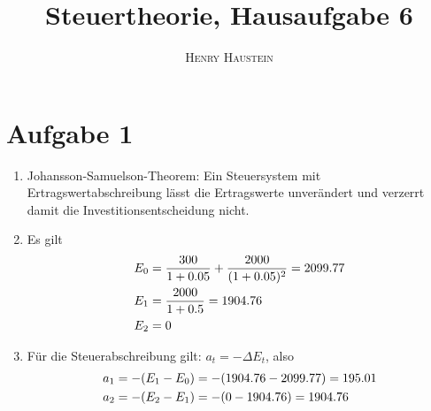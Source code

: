 \documentclass{article}
\title{\textbf{Steuertheorie, Hausaufgabe 6}}
\author{\textsc{Henry Haustein}}
\date{}
\begin{document}
	\maketitle
	
	\section*{Aufgabe 1}
	\begin{enumerate}[label=(\alph*)]
		\item Johansson-Samuelson-Theorem: Ein Steuersystem mit Ertragswertabschreibung lässt die Ertragswerte unverändert und verzerrt damit die Investitionsentscheidung nicht.
		\item Es gilt
		\begin{align}
			E_0 &= \frac{300}{1+0.05} + \frac{2000}{(1+0.05)^2} = 2099.77 \notag \\
			E_1 &= \frac{2000}{1+0.5} = 1904.76 \notag \\
			E_2 &= 0 \notag
		\end{align}
		\item Für die Steuerabschreibung gilt: $a_t=-\Delta E_t$, also
		\begin{align}
			a_1 &= -(E_1-E_0) = -(1904.76-2099.77) = 195.01 \notag \\
			a_2 &= -(E_2-E_1) = -(0-1904.76) = 1904.76 \notag
		\end{align}
	\end{enumerate}
\end{document}
